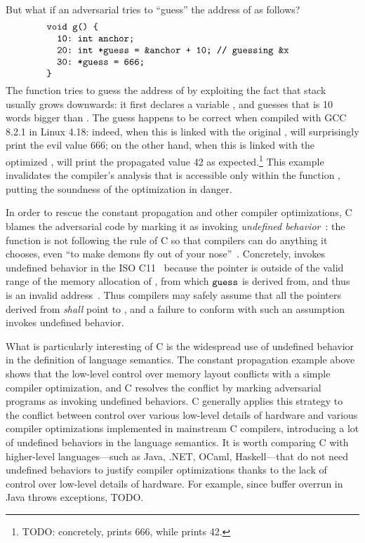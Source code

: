 But what if an adversarial  tries to ``guess'' the address of  as follows?
%
\[
\begin{minipage}{0.8\textwidth}
\begin{verbatim}
void g() {
  10: int anchor;
  20: int *guess = &anchor + 10; // guessing &x
  30: *guess = 666;
}
\end{verbatim}
\end{minipage}
\]
%
\noindent The function  tries to guess the address of  by exploiting the fact that
stack usually grows downwards: it first declares a variable , and guesses that
 is 10 words bigger than .  The guess happens to be correct when compiled
with GCC 8.2.1 in Linux 4.18: indeed, when this  is linked with the original ,
 will surprisingly print the evil value 666; on the other hand, when this  is
linked with the optimized ,  will print the propagated value 42 as
expected.\footnote{TODO: concretely, 
  prints 666, while  prints 42.}
This example invalidates the compiler's analysis that  is accessible only within the
function , putting the soundness of the optimization in danger.

In order to rescue the constant propagation and other compiler optimizations, C blames the
adversarial code by marking it as invoking \emph{undefined behavior}~\cite{undefined-behavior}: the
function  is not following the rule of C so that compilers can do anything it chooses,
even ``to make demons fly out of your nose''~\cite{nasal-demons}.  Concretely,  invokes
undefined behavior in the ISO C11~\cite{c11} because the pointer  is outside of the
valid range of the memory allocation of , from which $\texttt{guess}$ is derived from,
and thus  is an invalid address~\cite{c11-6.5.6p8}.  Thus compilers may safely assume
that all the pointers derived from  \emph{shall} point to , and a failure
to conform with such an assumption invokes undefined behavior.

What is particularly interesting of C is the widespread use of undefined behavior in the definition
of language semantics.  The constant propagation example above shows that the low-level control over
memory layout conflicts with a simple compiler optimization, and C resolves the conflict by marking
adversarial programs as invoking undefined behaviors.  C generally applies this strategy to the
conflict between control over various low-level details of hardware and various compiler
optimizations implemented in mainstream C compilers, introducing a lot of undefined behaviors in the
language semantics.  It is worth comparing C with higher-level languages---such as Java, .NET,
OCaml, Haskell---that do not need undefined behaviors to justify compiler optimizations thanks to
the lack of control over low-level details of hardware.  For example, since buffer overrun in Java
throws exceptions, TODO.


